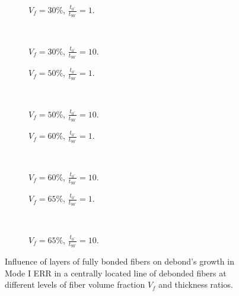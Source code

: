 \documentclass[review]{elsarticle}
\begin{document}
\begin{figure}[!h]
\centering
    \begin{subfigure}[b]{0.45\textwidth}
        \caption{$V_{f}=30\%$, $\frac{t_{0^{\circ}}}{t_{90^{\circ}}}=1$.}\label{subfig:abovefiber30MIthick1}
    \end{subfigure} ~
    \begin{subfigure}[b]{0.45\textwidth}
         \caption{$V_{f}=30\%$, $\frac{t_{0^{\circ}}}{t_{90^{\circ}}}=10$.}\label{subfig:abovefiber30MIthick10}
    \end{subfigure}

   \begin{subfigure}[b]{0.45\textwidth}
        \caption{$V_{f}=50\%$, $\frac{t_{0^{\circ}}}{t_{90^{\circ}}}=1$.}\label{subfig:abovefiber50MIthick1}
    \end{subfigure} ~
    \begin{subfigure}[b]{0.45\textwidth}
         \caption{$V_{f}=50\%$, $\frac{t_{0^{\circ}}}{t_{90^{\circ}}}=10$.}\label{subfig:abovefiber50MIthick10}
    \end{subfigure}

    \begin{subfigure}[b]{0.45\textwidth}
        \caption{$V_{f}=60\%$, $\frac{t_{0^{\circ}}}{t_{90^{\circ}}}=1$.}\label{subfig:abovefiber60MIthick1}
    \end{subfigure} ~
    \begin{subfigure}[b]{0.45\textwidth}
        \caption{$V_{f}=60\%$, $\frac{t_{0^{\circ}}}{t_{90^{\circ}}}=10$.}\label{subfig:abovefiber60MIthick10}
    \end{subfigure}

    \begin{subfigure}[b]{0.45\textwidth}
        \caption{$V_{f}=65\%$, $\frac{t_{0^{\circ}}}{t_{90^{\circ}}}=1$.}\label{subfig:abovefiber65MIthick1}
    \end{subfigure} ~
    \begin{subfigure}[b]{0.45\textwidth}
        \caption{$V_{f}=65\%$, $\frac{t_{0^{\circ}}}{t_{90^{\circ}}}=10$.}\label{subfig:abovefiber65MIthick10}
    \end{subfigure}

\caption{Influence of layers of fully bonded fibers on debond's growth in Mode I ERR in a centrally located line of debonded fibers at different levels of fiber volume fraction $V_{f}$ and thickness ratios.}\label{fig:abovefibersMI}
\end{figure}
\end{document}
